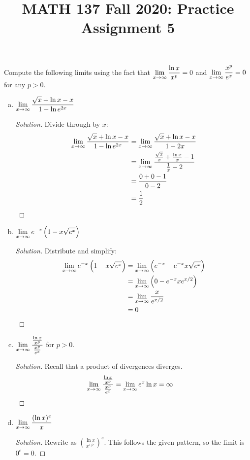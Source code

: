 
\title{MATH 137 Fall 2020: Practice Assignment 5}


\thispagestyle{firstpage}

\textbf{\@title}

\question Compute the following limits using the fact that $\displaystyle\lim_{x\to\infty}\frac{\ln x}{x^p}=0$
and $\displaystyle\lim_{x\to\infty}\frac{x^p}{e^x}=0$ for any $p>0$.
\begin{enumerate}[(a)]
  \item $\displaystyle\lim_{x\to\infty} \frac{\sqrt{x} + \ln x - x}{1 - \ln e^{2x}}$
        \begin{proof}[Solution]
          Divide through by $x$: \begin{align*}
            \lim_{x\to\infty} \frac{\sqrt{x} + \ln x - x}{1 - \ln e^{2x}}
             & = \lim_{x\to\infty} \frac{\sqrt{x} + \ln x - x}{1 - 2x}                              \\
             & = \lim_{x\to\infty} \frac{\frac{\sqrt{x}}{x} + \frac{\ln x}{x} - 1}{\frac{1}{x} - 2} \\
             & = \frac{0 + 0 - 1}{0 - 2}                                                   \\
             & = \frac{1}{2} \qedhere
          \end{align*}
        \end{proof}

  \item $\displaystyle\lim_{x\to\infty} e^{-x}\left(1-x\sqrt{e^x}\right)$
        \begin{proof}[Solution]
          Distribute and simplify: \begin{align*}
            \lim_{x\to\infty} e^{-x}\left(1-x\sqrt{e^x}\right)
             & = \lim_{x\to\infty} \left(e^{-x}-e^{-x}x\sqrt{e^x}\right) \\
             & = \lim_{x\to\infty} \left(0- e^{-x} x e^{x/2} \right)     \\
             & = \lim_{x\to\infty} \frac{x}{e^{x/2}}                     \\
             & = 0 \qedhere
          \end{align*}
        \end{proof}

  \item $\displaystyle\lim_{x\to\infty} \frac{\frac{\ln x}{x^p}}{\frac{x^p}{e^x}}$ for $p > 0$.
        \begin{proof}[Solution]
          Recall that a product of divergences diverges.
          \begin{align*}
            \lim_{x\to\infty} \frac{\frac{\ln x}{x^p}}{\frac{x^p}{e^x}}
             & = \lim_{x\to\infty} e^x\ln x = \infty \qedhere
          \end{align*}
        \end{proof}

  \item $\displaystyle\lim_{x\to\infty} \frac{(\ln x)^e}{x}$
        \begin{proof}[Solution]
          Rewrite as $\left(\frac{\ln x}{x^{1/e}}\right)^e$.
          This follows the given pattern, so the limit is $0^e=0$.
        \end{proof}
\end{enumerate}

